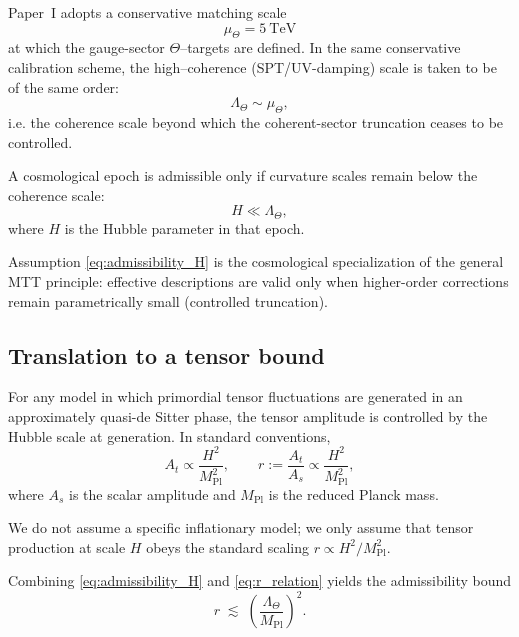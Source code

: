 \documentclass[11pt]{article}
\begin{document}
Paper~I adopts a conservative matching scale
\[
\mu_\Theta = 5~\mathrm{TeV}
\]
at which the gauge-sector $\Theta$--targets are defined.
In the same conservative calibration scheme, the high--coherence (SPT/UV-damping)
scale is taken to be of the same order:
\begin{equation}
\Lambda_\Theta \sim \mu_\Theta,
\label{eq:LambdaTheta_def}
\end{equation}
i.e. the coherence scale beyond which the coherent-sector truncation ceases to
be controlled.

\begin{assumption}
A cosmological epoch is admissible only if curvature scales remain below the
coherence scale:
\begin{equation}
H \ll \Lambda_\Theta,
\label{eq:admissibility_H}
\end{equation}
where $H$ is the Hubble parameter in that epoch.
\end{assumption}

\begin{remark}
Assumption \eqref{eq:admissibility_H} is the cosmological specialization of the
general MTT principle: effective descriptions are valid only when higher-order
corrections remain parametrically small (controlled truncation).
\end{remark}

\subsection{Translation to a tensor bound}

For any model in which primordial tensor fluctuations are generated in an
approximately quasi-de Sitter phase, the tensor amplitude is controlled by the
Hubble scale at generation. In standard conventions,
\begin{equation}
A_t \propto \frac{H^2}{M_{\mathrm{Pl}}^2},
\qquad
r := \frac{A_t}{A_s} \propto \frac{H^2}{M_{\mathrm{Pl}}^2},
\label{eq:r_relation}
\end{equation}
where $A_s$ is the scalar amplitude and $M_{\mathrm{Pl}}$ is the reduced Planck
mass.

We do not assume a specific inflationary model; we only assume that tensor
production at scale $H$ obeys the standard scaling $r \propto H^2/M_{\mathrm{Pl}}^2$.

Combining \eqref{eq:admissibility_H} and \eqref{eq:r_relation} yields the
admissibility bound
\begin{equation}
r \;\lesssim\; \left(\frac{\Lambda_\Theta}{M_{\mathrm{Pl}}}\right)^2.
\label{eq:r_bound_general}
\end{equation}
\end{document}
